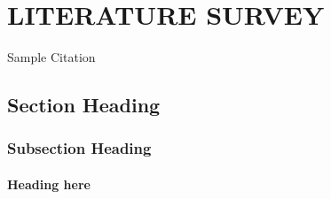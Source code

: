 \chapter{LITERATURE SURVEY}

\hspace{2em} \blindtext %
 Sample Citation \cite{2,5}
 
\section{Section Heading}

\hspace{2em} \blindtext  %


\subsection{Subsection Heading}
\hspace{2em} \blindtext %

\subsubsection{Heading here}
\hspace{2em} \blindtext %

